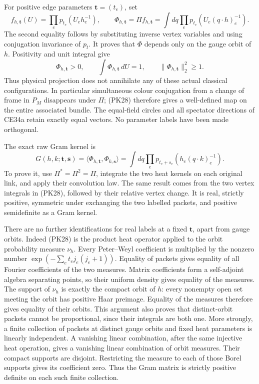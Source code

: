 \documentclass[11pt]{article}
\begin{document}
For positive edge parameters \(\mathbf t=(t_e)\), set
\[
 f_{h,\mathbf t}(U)=\prod_e p_{t_e}(U_eh_e^{-1}),\qquad
 \Phi_{h,\mathbf t}=\Pi f_{h,\mathbf t}
 =\int dq\prod_e p_{t_e}(U_e(q\cdot h)_e^{-1}).
 \tag{PK28}
\]
The second equality follows by substituting inverse vertex variables and
using conjugation invariance of \(p_t\). It proves that \(\Phi\) depends
only on the gauge orbit of \(h\). Positivity and unit integral give
\[
 \Phi_{h,\mathbf t}>0,\qquad \int\Phi_{h,\mathbf t}\,dU=1,
 \qquad \|\Phi_{h,\mathbf t}\|_2^2\ge1.
 \tag{PK29}
\]
Thus physical projection does not annihilate any of these actual
classical configurations. In particular simultaneous colour conjugation
from a change of frame in \(P_M\) disappears under \(\Pi\); (PK28)
therefore gives a well-defined map on the entire associated bundle.
The equal-field circles and all spectator directions of CE34a retain
exactly equal vectors. No parameter labels have been made orthogonal.

The exact raw Gram kernel is
\[
 G(h,k;\mathbf t,\mathbf s)
 =\langle\Phi_{h,\mathbf t},\Phi_{k,\mathbf s}\rangle
 =\int dq\prod_e p_{t_e+s_e}(h_e(q\cdot k)_e^{-1}).
 \tag{PK30}
\]
To prove it, use \(\Pi^*=\Pi^2=\Pi\), integrate the two heat kernels
on each original link, and apply their convolution law. The same result
comes from the two vertex integrals in (PK28), followed by their relative
vertex change. It is real, strictly positive, symmetric under exchanging
the two labelled packets, and positive semidefinite as a Gram kernel.

There are no further identifications for real labels at a fixed
\(\mathbf t\), apart from gauge orbits. Indeed (PK28) is the product heat
operator applied to the orbit probability measure \(\nu_h\). Every
Peter–Weyl coefficient is multiplied by the nonzero number
\(\exp(-\sum_et_ej_e(j_e+1))\). Equality of packets gives equality of
all Fourier coefficients of the two measures. Matrix coefficients form a
self-adjoint algebra separating points, so their uniform density gives
equality of the measures. The support of \(\nu_h\) is exactly the
compact orbit of \(h\): every nonempty open set meeting the orbit has
positive Haar preimage. Equality of the measures therefore gives equality
of their orbits. This argument also proves that distinct-orbit packets
cannot be proportional, since their integrals are both one. More strongly,
a finite collection of packets at distinct gauge orbits and fixed heat
parameters is linearly independent. A vanishing linear combination, after
the same injective heat operation, gives a vanishing linear combination of
orbit measures. Their compact supports are disjoint. Restricting the measure
to each of those Borel supports gives its coefficient zero. Thus the Gram
matrix is strictly positive definite on each such finite collection.
\end{document}
